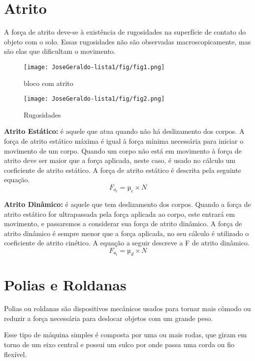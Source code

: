 \section{Atrito}
    A força de atrito deve-se à existência de rugosidades na 
superfície de contato do objeto com o solo. Essas rugosidades não são observadas 
macroscopicamente, mas são elas que dificultam o movimento\cite{da2019estudo}.


\begin{figure}[ht]
    \centering
    \texttt{[image: JoseGeraldo-lista1/fig/fig1.png]}
    \caption{bloco com atrito}
    
    \texttt{[image: JoseGeraldo-lista1/fig/fig2.png]}
    \caption{Rugosidades}
\end{figure}


\textbf{Atrito Estático:} é aquele que atua quando não há deslizamento dos corpos. 
A força de atrito estático máxima é igual à força mínima necessária para iniciar o 
movimento de um corpo. Quando um corpo não está em movimento à força de atrito 
deve ser maior que a força aplicada, neste caso, é usado no cálculo um coeficiente 
de atrito estático. A força de atrito estático é descrita pela seguinte equação\cite{da2019estudo}.
\begin{equation}
            F_{a_t} = µ_e \times N
            \label{equ:Atrito estatico}
\end{equation}

\textbf{Atrito Dinâmico:} é aquele que tem deslizamento dos corpos. Quando a força 
de atrito estático for ultrapassada pela força aplicada ao corpo, este entrará em 
movimento, e passaremos a considerar sua força de atrito dinâmico. A força de atrito 
dinâmico é sempre menor que a força aplicada, no seu cálculo é utilizado o 
coeficiente de atrito cinético. A equação a seguir descreve a F de atrito dinâmico\cite{da2019estudo}.
\begin{equation}
            F_{a_t} = µ_d \times N
            \label{equ:Atrito dinamico}
\end{equation}

\section{Polias e Roldanas}
Polias ou roldanas são dispositivos mecânicos usados para tornar mais cômodo ou reduzir a força necessária para deslocar objetos com um grande peso.

Esse tipo de máquina simples é composta por uma ou mais rodas, que giram em torno de um eixo central e possui um sulco por onde passa uma corda ou fio flexível\cite{site1}.

